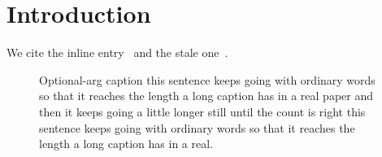 \documentclass{article}
\begin{document}
\section{Introduction}
We cite the inline entry~\cite{inline2024} and the stale one~\cite{stale2020}.

% 

\begin{figure}[t]
\centering
{}
\caption[Short]{Optional-arg caption this sentence keeps going with ordinary words so that it reaches the length a long caption has in a real paper and then it keeps going a little longer still until the count is right this sentence keeps going with ordinary words so that it reaches the length a long caption has in a real.}
\end{figure}


\end{document}

